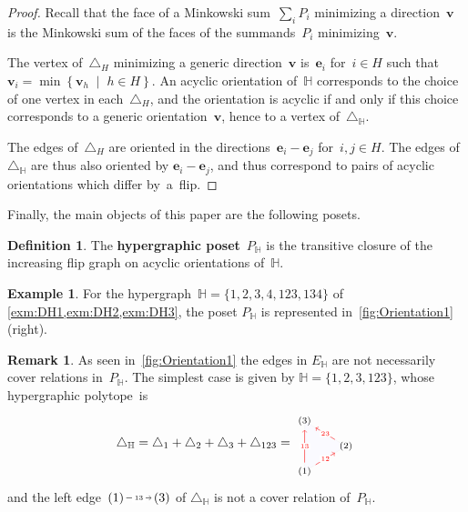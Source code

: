 \documentclass{amsart}
\theoremstyle{definition}
\newtheorem{definition}[theorem]{Definition}
\newtheorem{example}[theorem]{Example}
\newtheorem{remark}[theorem]{Remark}
\renewcommand{\b}[1]{\boldsymbol{#1}} %
\newcommand{\set}[2]{\left\{ #1 \;\middle|\; #2 \right\}} %
\newcommand{\simplex}{\triangle} %
\newcommand{\defn}[1]{\textbf{\textsf{\color{PineGreen} #1}}} %
\newcommand{\HH}{\mathbb H}  %
\newcommand{\flip}[4]{\ensuremath{#1 \, \begin{tikzpicture}[scale=1,baseline=-.1cm] \path[->]  (0,0) edge node[fill=white,inner sep=2pt, font=\tiny ] {$#2#3$} (.7,0); \end{tikzpicture} \, #4}}
\begin{document}
\begin{proof}
Recall that the face of a Minkowski sum~$\sum_i P_i$ minimizing a direction~$\b{v}$ is the Minkowski sum of the faces of the summands~$P_i$ minimizing~$\b{v}$.

The vertex of~$\simplex_H$ minimizing a generic direction~$\b{v}$ is~$\b{e}_i$ for~$i \in H$ such that~$\b{v}_i = \min\set{\b{v}_h\!}{\!h \!\in\! H}$.
An acyclic orientation of~$\HH$ corresponds to the choice of one vertex in each~$\simplex_H$, and the orientation is acyclic if and only if this choice corresponds to a generic orientation~$\b{v}$, hence to a vertex of~$\simplex_\HH$.

The edges of~$\simplex_H$ are oriented in the directions~$\b{e}_i-\b{e}_j$ for~$i,j \in H$.
The edges of~$\simplex_\HH$ are thus also oriented by $\b{e}_i-\b{e}_j$, and thus correspond to pairs of acyclic orientations which differ by~a~flip.
\end{proof}

Finally, the main objects of this paper are the following posets.

\begin{definition}
The \defn{hypergraphic poset}~$P_\HH$ is the transitive closure of the increasing flip graph on acyclic orientations of~$\HH$.
\end{definition}

\begin{example}
\label{exm:DH4}
For the hypergraph~$\HH=\{ 1, 2, 3, 4, 123, 134 \}$ of \cref{exm:DH1,exm:DH2,exm:DH3}, the poset  $P_\HH$ is represented in~\cref{fig:Orientation1}\,(right).
\end{example}

\begin{remark}
\label{rem:edgeNotCover}
As seen in~\cref{fig:Orientation1} the edges in $E_\HH$ are not necessarily cover relations in~$P_\HH$.
The simplest case is given by
$\HH=\{ 1, 2, 3, 123 \}$, 
whose hypergraphic polytope~is
\[
	\simplex_\HH = \simplex_1 + \simplex_2 + \simplex_3 + \simplex_{123} =
	\begin{tikzpicture}[scale=.7,baseline=.0cm]
		\draw [color=gray!10,fill=blue!2] (0,-1)--(0,1)--(1.632,0)--(0,-1) ; 
		\node (a) at (0,-1) {$\scriptstyle (1)$};
		\node (b) at (1.632,0) {$\scriptstyle (2)$};
		\node (c) at (0,1) {$\scriptstyle (3)$};
		\path[color=red, ->] (a) edge node[fill=white,inner sep=1pt, font=\tiny ] {$ \scriptscriptstyle 13 $} (c);
		\path[color=red, ->] (a) edge node[fill=white,inner sep=1pt, font=\tiny ] {$\scriptscriptstyle  12 $} (b);
		\path[color=red, ->] (b) edge node[fill=white,inner sep=1pt, font=\tiny ] {$ \scriptscriptstyle 23 $} (c);
	\end{tikzpicture}
\]
and the left edge~$\flip{(1)}{1}{3}{(3)}$ of $\simplex_\HH$ is not a cover relation of~$P_\HH$.
\end{remark}
\end{document}
